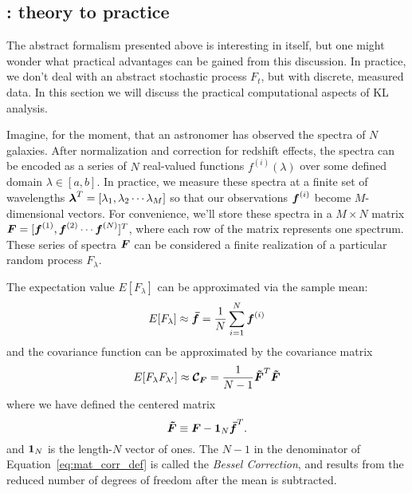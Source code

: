 \subsection{\KL: theory to practice}
The abstract formalism presented above is interesting in itself, but one
might wonder what practical advantages can be gained from this discussion.
In practice, we don't deal with an abstract stochastic process $F_t$, but
with discrete, measured data.  In this section we will discuss the
practical computational aspects of KL analysis.

Imagine, for the moment, that an astronomer has observed the spectra of
$N$ galaxies.  After normalization and correction for redshift effects,
the spectra can be encoded as a series of $N$ real-valued functions
$f^{(i)}(\lambda)$ over some defined domain $\lambda \in [a, b]$.
In practice, we measure these spectra at a finite set of wavelengths
$\boldsymbol{\lambda}^T = [\lambda_1, \lambda_2 \cdots \lambda_M]$ so that
our observations $\boldsymbol{f}^{(i)}$ become $M$-dimensional vectors.  For
convenience, we'll store these spectra in a $M \times N$ matrix
$\boldsymbol{F} = [\boldsymbol{f}^{(1)}, \boldsymbol{f}^{(2)} \cdots \boldsymbol{f}^{(N)}]^T$,
where each row of the matrix represents one spectrum.
These series of spectra $\boldsymbol{F}$ 
can be considered a finite realization of a particular
random process $F_\lambda$.

The expectation value $E[F_\lambda]$ can be approximated via the sample mean:
\begin{equation}
  E[F_\lambda] \approx \boldsymbol{\bar{f}}
  = \frac{1}{N} \sum_{i=1}^N \boldsymbol{f}^{(i)}
\end{equation}
and the covariance function can be approximated by the covariance matrix
\begin{equation}
  \label{eq:mat_corr_def}
  E[F_\lambda F_{\lambda^\prime}] \approx 
  \boldsymbol{\mathcal{C}_F} = \frac{1}{N - 1} \boldsymbol{\tilde{F}}^T \boldsymbol{\tilde{F}}
\end{equation}
where we have defined the centered matrix
\begin{equation}
  \boldsymbol{\tilde{F}} \equiv \boldsymbol{F} - \boldsymbol{1}_N\boldsymbol{\bar{f}}^T.
\end{equation}
and $\boldsymbol{1}_N$ is the length-$N$ vector of ones.  The $N-1$ in the
denominator of Equation~\ref{eq:mat_corr_def} is called the
{\it Bessel Correction}, and results from the reduced number of degrees of
freedom after the mean is subtracted.


